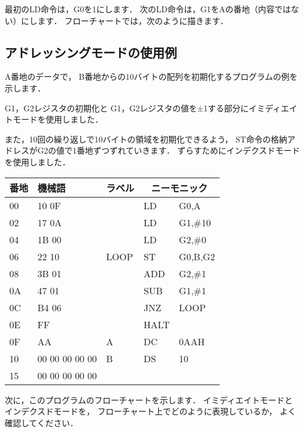 最初のLD命令は，G0を1にします．
次のLD命令は，G1をAの番地（内容ではない）にします．
フローチャートでは，次のように描きます．

\begin{center}
\end{center}

\subsection{アドレッシングモードの使用例}
A番地のデータで，
B番地からの10バイトの配列を初期化するプログラムの例を示します．

G1，G2レジスタの初期化と
G1，G2レジスタの値を±1する部分にイミディエイトモードを使用しました．

また，10回の繰り返しで10バイトの領域を初期化できるよう，
ST命令の格納アドレスがG2の値で1番地ずつずれていきます．
ずらすためにインデクスドモードを使用しました．

{\small\ttfamily\begin{center}
  \begin{tabular}{|l|l|l|l l|} \hline
    番地 & 機械語 & ラベル & \multicolumn{2}{|c|}{ニーモニック} \\
    \hline
    00 & 10 0F &      & LD   & G0,A          \\
    02 & 17 0A &      & LD   & G1,\#10       \\
    04 & 1B 00 &      & LD   & G2,\#0        \\
    06 & 22 10 & LOOP & ST   & G0,B,G2       \\
    08 & 3B 01 &      & ADD  & G2,\#1        \\
    0A & 47 01 &      & SUB  & G1,\#1        \\
    0C & B4 06 &      & JNZ  & LOOP          \\
    0E & FF    &      & HALT &               \\
    0F & AA    & A    & DC   & 0AAH          \\
    10 & 00 00 00 00 00 & B    & DS   & 10            \\
    15 & 00 00 00 00 00 &      &      &               \\
    \hline
  \end{tabular}
\end{center}}

次に，このプログラムのフローチャートを示します．
イミディエイトモードとインデクスドモードを，
フローチャート上でどのように表現しているか，
よく確認してください．

